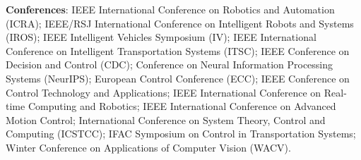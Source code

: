 \vspace{0.3cm}
{\normalsize\bfseries\sffamily Conferences}: IEEE International Conference on Robotics and Automation (ICRA); IEEE/RSJ International Conference on Intelligent Robots and Systems (IROS); IEEE Intelligent Vehicles Symposium (IV); IEEE International Conference on Intelligent Transportation Systems (ITSC); IEEE Conference on Decision and Control (CDC); Conference on Neural Information Processing Systems (NeurIPS); European Control Conference (ECC); IEEE Conference on Control Technology and Applications; IEEE International Conference on Real-time Computing and Robotics; IEEE International Conference on Advanced Motion Control; International Conference on System Theory, Control and Computing (ICSTCC); IFAC Symposium on Control in Transportation Systems; Winter Conference on Applications of Computer Vision (WACV).